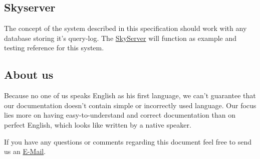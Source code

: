 \subsection*{Skyserver}
The concept of the system described in this specification should work with any database
storing it's query-log. The \href{http://skyserver.sdss.org/public/en/}{SkyServer} will function
as example and testing reference for this system.

\subsection*{About us}
Because no one of us speaks English as his first language,
we can't guarantee that our documentation doesn't contain simple
or incorrectly used language. Our focus lies more on
having easy-to-understand and correct documentation
than on perfect English, which looks like written by a native speaker.

If you have any questions or comments regarding this document feel free to send us an 
 \href{mailto:pse10-group14-ws12@ira.uni-karlsruhe.de}{E-Mail}.






